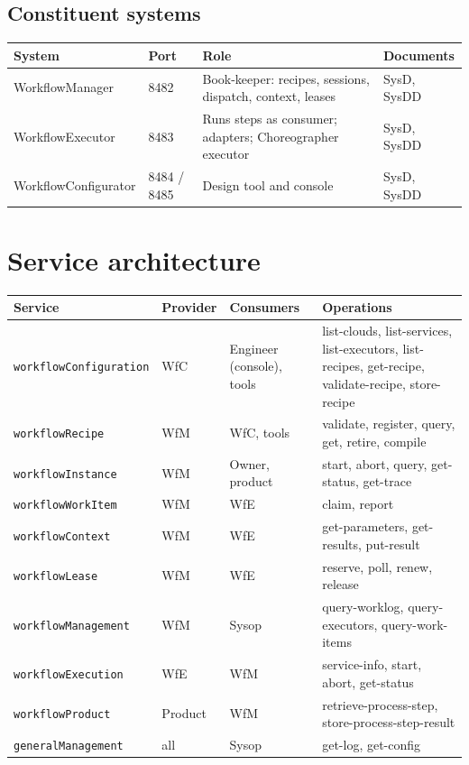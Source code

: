 \documentclass[a4paper]{arrowhead}
\begin{document}
\subsection{Constituent systems}

{\small
\begin{longtable}{|p{3.6cm}|p{2.2cm}|p{6.6cm}|p{3.4cm}|}

\hline
\rowcolor{gray!33} System & Port & Role & Documents \\ \hline
\endhead
WorkflowManager & 8482 & Book-keeper: recipes, sessions, dispatch, context, leases & SysD, SysDD \\ \hline
WorkflowExecutor & 8483 & Runs steps as consumer; adapters; Choreographer executor & SysD, SysDD \\ \hline
WorkflowConfigurator & 8484 / 8485 & Design tool and console & SysD, SysDD \\ \hline
\end{longtable}
}


\newpage
\section{Service architecture}
\label{sec:services}

{\small
\begin{longtable}{|p{3.6cm}|p{1.6cm}|p{3.4cm}|p{7.2cm}|}

\hline
\rowcolor{gray!33} Service & Provider & Consumers & Operations \\ \hline
\endhead
\texttt{workflowConfiguration} & WfC & Engineer (console), tools & list-clouds, list-services, list-executors, list-recipes, get-recipe, validate-recipe, store-recipe \\ \hline
\texttt{workflowRecipe} & WfM & WfC, tools & validate, register, query, get, retire, compile \\ \hline
\texttt{workflowInstance} & WfM & Owner, product & start, abort, query, get-status, get-trace \\ \hline
\texttt{workflowWorkItem} & WfM & WfE & claim, report \\ \hline
\texttt{workflowContext} & WfM & WfE & get-parameters, get-results, put-result \\ \hline
\texttt{workflowLease} & WfM & WfE & reserve, poll, renew, release \\ \hline
\texttt{workflowManagement} & WfM & Sysop & query-worklog, query-executors, query-work-items \\ \hline
\texttt{workflowExecution} & WfE & WfM & service-info, start, abort, get-status \\ \hline
\texttt{workflowProduct} & Product & WfM & retrieve-process-step, store-process-step-result \\ \hline
\texttt{generalManagement} & all & Sysop & get-log, get-config \\ \hline
\end{longtable}
}
\end{document}
